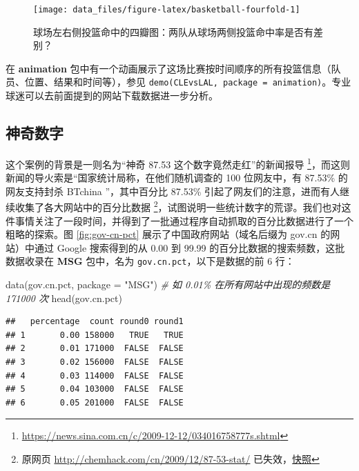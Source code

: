 \documentclass[
  b5paper,
  UTF8,twoside]{book}
\newenvironment{Shaded}{\begin{snugshade}}{\end{snugshade}}
\newcommand{\AttributeTok}[1]{\textcolor[rgb]{0.77,0.63,0.00}{#1}}
\newcommand{\CommentTok}[1]{\textcolor[rgb]{0.56,0.35,0.01}{\textit{#1}}}
\newcommand{\FunctionTok}[1]{\textcolor[rgb]{0.00,0.00,0.00}{#1}}
\newcommand{\NormalTok}[1]{#1}
\newcommand{\StringTok}[1]{\textcolor[rgb]{0.31,0.60,0.02}{#1}}
\begin{document}
\begin{figure}

{\centering \texttt{[image: data\_files/figure-latex/basketball-fourfold-1]} 

}

\caption[ 球场左右侧投篮命中的四瓣图 ]{球场左右侧投篮命中的四瓣图：两队从球场两侧投篮命中率是否有差别？}\label{fig:basketball-fourfold}
\end{figure}



在 \textbf{animation} 包中有一个动画展示了这场比赛按时间顺序的所有投篮信息（队员、位置、结果和时间等），参见 \texttt{demo(\textquotesingle{}CLEvsLAL\textquotesingle{},\ package\ =\ \textquotesingle{}animation\textquotesingle{})}。专业球迷可以去前面提到的网站下载数据进一步分析。

\hypertarget{subsec:percentage}{%
\subsection{神奇数字}\label{subsec:percentage}}

这个案例的背景是一则名为``神奇 87.53 这个数字竟然走红''的新闻报导 \footnote{\url{https://news.sina.com.cn/c/2009-12-12/034016758777s.shtml}}，而这则新闻的导火索是``国家统计局称，在他们随机调查的 100 位网友中，有 87.53\% 的网友支持封杀 BTchina ''，其中百分比 87.53\% 引起了网友们的注意，进而有人继续收集了各大网站中的百分比数据 \footnote{原网页 \url{http://chemhack.com/cn/2009/12/87-53-stat/} 已失效，\href{https://web.archive.org/web/20120115032226/http://chemhack.com/cn/2009/12/87-53-stat/}{快照}}，试图说明一些统计数字的荒谬。我们也对这件事情关注了一段时间，并得到了一批通过程序自动抓取的百分比数据进行了一个粗略的探索。图 \ref{fig:gov-cn-pct} 展示了中国政府网站（域名后缀为 gov.cn 的网站）中通过 Google 搜索得到的从 0.00 到 99.99 的百分比数据的搜索频数，这批数据收录在 \textbf{MSG} 包中，名为 \texttt{gov.cn.pct}，以下是数据的前 6 行：

\begin{Shaded}
\begin{Highlighting}[]
\FunctionTok{data}\NormalTok{(gov.cn.pct, }\AttributeTok{package =} \StringTok{"MSG"}\NormalTok{)}
\CommentTok{\# 如 0.01\% 在所有网站中出现的频数是 171000 次}
\FunctionTok{head}\NormalTok{(gov.cn.pct)}
\end{Highlighting}
\end{Shaded}

\begin{verbatim}
##   percentage  count round0 round1
## 1       0.00 158000   TRUE   TRUE
## 2       0.01 171000  FALSE  FALSE
## 3       0.02 156000  FALSE  FALSE
## 4       0.03 114000  FALSE  FALSE
## 5       0.04 103000  FALSE  FALSE
## 6       0.05 201000  FALSE  FALSE
\end{verbatim}
\end{document}
